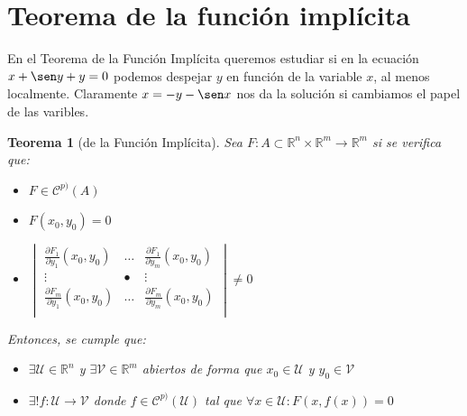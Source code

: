 \documentclass[10pt,a4paper,openright]{book}
\theoremstyle{break}
\newtheorem*{theo}{Teorema}
\begin{document}
\section{Teorema de la función implícita}
En el Teorema de la Función Implícita queremos estudiar si en la ecuación $x  + \sen y + y = 0$ podemos despejar $y$ en función de la variable $x$, al menos localmente. Claramente $x = -y - \sen x$ nos da la solución si cambiamos el papel de las varibles.

\begin{theo}[de la Función Implícita]
Sea $F: A \subset \mathbb{R}^n \times \mathbb{R}^m \to \mathbb{R}^m$ si se verifica que:
\begin{itemize}
\item $F \in \mathcal{C}^{p)}(A)$
\item $F(x_0, y_0) = 0$
\item $\begin{vmatrix} \frac{\partial F_1}{\partial y_1} (x_0, y_0) & \ldots & \frac{\partial F_1}{\partial y_m} (x_0, y_0) \\ \vdots & • & \vdots \\ \frac{\partial F_m}{\partial y_1} (x_0, y_0) & \ldots & \frac{\partial F_m}{\partial y_m} (x_0, y_0) \\ \end{vmatrix} \neq 0$
\end{itemize}
Entonces, se cumple que:
\begin{itemize}
\item $\exists \mathcal{U}\in \mathbb{R}^n$ y $\exists \mathcal{V} \in \mathbb{R}^m$ abiertos de forma que $x_0 \in \mathcal{U}$ y $y_0\in \mathcal{V}$
\item $\exists ! f: \mathcal{U} \to \mathcal{V}$ donde $f \in \mathcal{C}^{p)} (\mathcal{U})$ tal que $\forall x \in \mathcal{U} : F(x, f(x)) = 0$
\end{itemize}
\end{theo}
\end{document}
